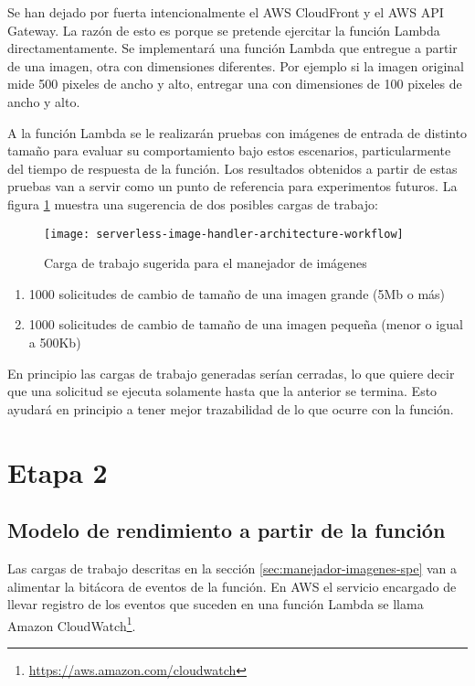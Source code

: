 Se han dejado por fuerta intencionalmente el AWS CloudFront y el AWS API Gateway. La razón de esto es porque se pretende ejercitar la función Lambda directamentamente. Se implementará una función Lambda que entregue a partir de una imagen, otra con dimensiones diferentes. Por ejemplo si la imagen original mide 500 pixeles de ancho y alto, entregar una con dimensiones de 100 pixeles de ancho y alto. 

A la función Lambda se le realizarán pruebas con imágenes de entrada de distinto tamaño para evaluar su comportamiento bajo estos escenarios, particularmente del tiempo de respuesta de la función. Los resultados obtenidos a partir de estas pruebas van a servir como un punto de referencia para experimentos futuros. La figura \ref{fig:serverless-image-handler-architecture-workflow} muestra una sugerencia de dos posibles cargas de trabajo: 

\begin{figure}[h]
  \centering
  \texttt{[image: serverless-image-handler-architecture-workflow]}
  \caption[Carga de trabajo sugerida para el manejador de imágenes]{Carga de trabajo sugerida para el manejador de imágenes}
  \label{fig:serverless-image-handler-architecture-workflow}
\end{figure}

\begin{enumerate}
    \item 1000 solicitudes de cambio de tamaño de una imagen grande (5Mb o más)
    \item 1000 solicitudes de cambio de tamaño de una imagen pequeña (menor o igual a 500Kb)
\end{enumerate}

En principio las cargas de trabajo generadas serían cerradas, lo que quiere decir que una solicitud se ejecuta solamente hasta que la anterior se termina. Esto ayudará en principio a tener mejor trazabilidad de lo que ocurre con la función.

\section{Etapa 2}

\subsection{Modelo de rendimiento a partir de la función}
Las cargas de trabajo descritas en la sección \ref{sec:manejador-imagenes-spe} van a alimentar la bitácora de eventos de la función. En AWS el servicio encargado de llevar registro de los eventos que suceden en una función Lambda se llama Amazon CloudWatch\footnote{\url{https://aws.amazon.com/cloudwatch}}. 

